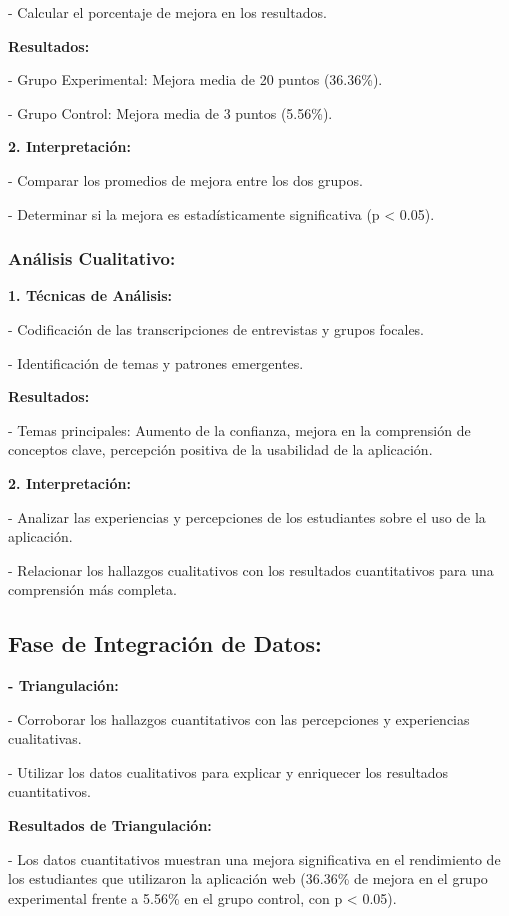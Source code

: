    - Calcular el porcentaje de mejora en los resultados.

   \textbf{Resultados:}
   
   - Grupo Experimental: Mejora media de 20 puntos (36.36\%).
   
   - Grupo Control: Mejora media de 3 puntos (5.56\%).

\textbf{2. Interpretación:}

   - Comparar los promedios de mejora entre los dos grupos.
   
   - Determinar si la mejora es estadísticamente significativa (p < 0.05).

\subsubsection{Análisis Cualitativo:}

\textbf{1. Técnicas de Análisis:}

   - Codificación de las transcripciones de entrevistas y grupos focales.
   
   - Identificación de temas y patrones emergentes.

   \textbf{Resultados:}
   
   - Temas principales: Aumento de la confianza, mejora en la comprensión de conceptos clave, percepción positiva de la usabilidad de la aplicación.

\textbf{2. Interpretación:}

   - Analizar las experiencias y percepciones de los estudiantes sobre el uso de la aplicación.
   
   - Relacionar los hallazgos cualitativos con los resultados cuantitativos para una comprensión más completa.

\subsection{Fase de Integración de Datos:}

\textbf{- Triangulación:}

  - Corroborar los hallazgos cuantitativos con las percepciones y experiencias cualitativas.
  
  - Utilizar los datos cualitativos para explicar y enriquecer los resultados cuantitativos.

  \textbf{Resultados de Triangulación:}
  
  - Los datos cuantitativos muestran una mejora significativa en el rendimiento de los estudiantes que utilizaron la aplicación web (36.36\% de mejora en el grupo experimental frente a 5.56\% en el grupo control, con p < 0.05).
  
